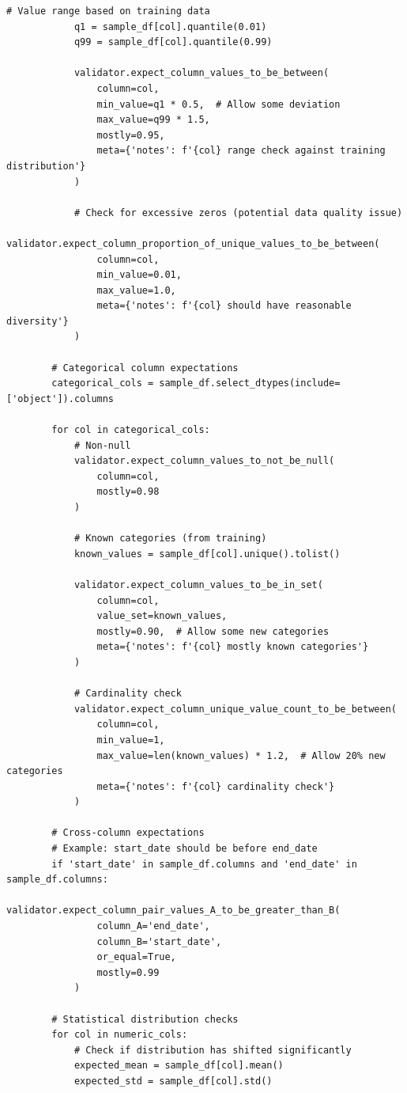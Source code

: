 \begin{lstlisting}[style=python, caption=Comprehensive Data Validation with Great Expectations]
            # Value range based on training data
            q1 = sample_df[col].quantile(0.01)
            q99 = sample_df[col].quantile(0.99)

            validator.expect_column_values_to_be_between(
                column=col,
                min_value=q1 * 0.5,  # Allow some deviation
                max_value=q99 * 1.5,
                mostly=0.95,
                meta={'notes': f'{col} range check against training distribution'}
            )

            # Check for excessive zeros (potential data quality issue)
            validator.expect_column_proportion_of_unique_values_to_be_between(
                column=col,
                min_value=0.01,
                max_value=1.0,
                meta={'notes': f'{col} should have reasonable diversity'}
            )

        # Categorical column expectations
        categorical_cols = sample_df.select_dtypes(include=['object']).columns

        for col in categorical_cols:
            # Non-null
            validator.expect_column_values_to_not_be_null(
                column=col,
                mostly=0.98
            )

            # Known categories (from training)
            known_values = sample_df[col].unique().tolist()

            validator.expect_column_values_to_be_in_set(
                column=col,
                value_set=known_values,
                mostly=0.90,  # Allow some new categories
                meta={'notes': f'{col} mostly known categories'}
            )

            # Cardinality check
            validator.expect_column_unique_value_count_to_be_between(
                column=col,
                min_value=1,
                max_value=len(known_values) * 1.2,  # Allow 20% new categories
                meta={'notes': f'{col} cardinality check'}
            )

        # Cross-column expectations
        # Example: start_date should be before end_date
        if 'start_date' in sample_df.columns and 'end_date' in sample_df.columns:
            validator.expect_column_pair_values_A_to_be_greater_than_B(
                column_A='end_date',
                column_B='start_date',
                or_equal=True,
                mostly=0.99
            )

        # Statistical distribution checks
        for col in numeric_cols:
            # Check if distribution has shifted significantly
            expected_mean = sample_df[col].mean()
            expected_std = sample_df[col].std()


\end{lstlisting}
